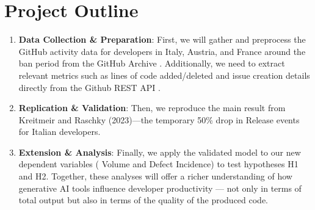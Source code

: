 \section*{Project Outline}

\begin{enumerate}
  \item \textbf{Data Collection \& Preparation}: First, we will gather and preprocess the GitHub activity data for developers in Italy, Austria, and France around the ban period from the GitHub Archive \cite{github_archive}. Additionally, we need to extract relevant metrics such as lines of code added/deleted and issue creation details directly from the Github REST API \cite{github_api}.
  \item \textbf{Replication \& Validation}: Then, we reproduce the main result from Kreitmeir and Raschky (2023)—the temporary 50\% drop in Release events for Italian developers.
  \item \textbf{Extension \& Analysis}: Finally, we apply the validated model to our new dependent variables ( Volume and Defect Incidence) to test hypotheses H1 and H2. Together, these analyses will offer a richer understanding of how generative AI tools influence developer productivity — not only in terms of total output but also in terms of the quality of the produced code.
\end{enumerate}
